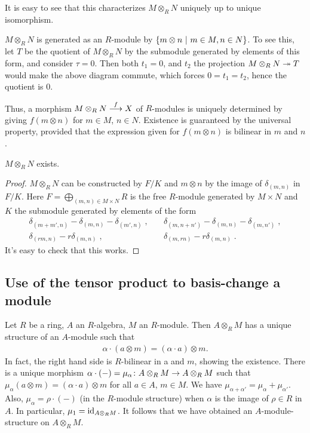 \documentclass[a4paper,parskip=half,numbers=enddot, DIV=12]{scrreprt}
\begin{document}
\begin{rem}
    \begin{alphanumerate}
        \item 
            It is easy to see that this characterizes $M\otimes_R N$ uniquely up to unique isomorphism.
        \item 
            $M\otimes_R N$ is generated as an $R$-module by $\left\{m\otimes n \ \middle|\  m\in M, n\in N\right\}$. To see this, let $T$ be the quotient of $M\otimes_RN$ by the submodule generated by elements of this form, and consider $\tau = 0$. Then both $t_1=0$, and $t_2$ the projection $M\otimes_R N \epimorphism T$ would make the above diagram commute, which forces $0=t_1=t_2$, hence the quotient is $0$. 
            
            Thus, a morphism $M\otimes_R N \morphism[f] X$ of $R$-modules is uniquely determined by giving $f(m\otimes n)$ for $m\in M$, $n\in N$. Existence is guaranteed by the universal property, provided that the expression given for $f(m\otimes n)$ is bilinear in $m$ and $n$.
    \end{alphanumerate}
\end{rem}
\begin{prop}
    $M\otimes_R N$ exists.
\end{prop}
\begin{proof}
    $M\otimes_R N$ can be constructed by $F/K$ and $m\otimes n$ by the image of $\delta_{(m,n)}$ in $F/K$. Here $F=\bigoplus_{(m,n)\in M\times N}R$ is the free $R$-module generated by $M\times N$ and $K$ the submodule generated by elements of the form 
    \begin{align*}
        \delta_{(m+m',n)}-\delta_{(m,n)}-\delta_{(m',n)}\;,\quad&\delta_{(m,n+n')}-\delta_{(m,n)}-\delta_{(m,n')}\;,\\
        \delta_{(rm,n)}-r\delta_{(m,n)}\;,\quad&\delta_{(m,rn)}-r\delta_{(m,n)}\;.
    \end{align*}
    It's easy to check that this works.
\end{proof}
\subsection{Use of the tensor product to basis-change a module}
Let $R$ be a ring, $A$ an $R$-algebra, $M$ an $R$-module. Then $A\otimes_RM$ has a unique structure of an $A$-module such that
\begin{align*}
    \alpha\cdot (a\otimes m) = (\alpha \cdot a)\otimes m.
\end{align*}
In fact, the right hand side is $R$-bilinear in a and $m$, showing the existence. There is a unique morphism $\alpha\cdot(-) = \mu_\alpha\colon A\otimes_R M \morphism A\otimes_R M$ such that $\mu_\alpha(a\otimes m) = (\alpha\cdot a) \otimes m$ for all $a\in A$, $m\in M$. We have $\mu_{\alpha+\alpha'} = \mu_{\alpha}+\mu_{\alpha'}$. Also, $\mu_\alpha = \rho\cdot(-)$ (in the $R$-module structure) when $\alpha$ is the image of $\rho\in R$ in $A$. In particular, $\mu_1 = \operatorname{id}_{A\otimes_R M}$. It follows that we have obtained an $A$-module-structure on $A\otimes_R M$.
\end{document}

